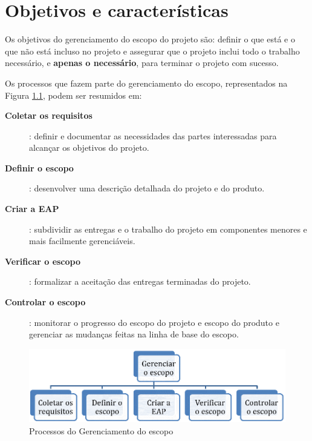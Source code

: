 \chapter{Objetivos e características}

Os objetivos do gerenciamento do escopo do projeto são: definir o que está e o que não está incluso no projeto e assegurar que o projeto inclui todo o trabalho necessário, e \textbf{apenas o necessário}, para terminar o projeto com sucesso.

Os processos que fazem parte do gerenciamento do escopo, representados na Figura \ref{fig:proc:ger:escopo}, podem ser resumidos em:

\begin{description}
	
	\item[\textbf{Coletar os requisitos}]: definir e documentar as necessidades das partes interessadas para alcançar os objetivos do projeto.
	
	\item[\textbf{Definir o escopo}]: desenvolver uma descrição detalhada do projeto e do produto.
	
	\item[\textbf{Criar a EAP}]: subdividir as entregas e o trabalho do projeto em componentes menores e mais facilmente gerenciáveis.
	
	\item[\textbf{Verificar o escopo}]: formalizar a aceitação das entregas terminadas do projeto.
	
	\item[\textbf{Controlar o escopo}]: monitorar o progresso do escopo do projeto e escopo do produto e gerenciar as mudanças feitas na linha de base do escopo.	

\end{description}

\begin{figure}[!h]
	\centering
	\includegraphics[scale=0.75]{Figuras/gerenciamento_escopo.png}
	\caption{Processos do Gerenciamento do escopo}
	\label{fig:proc:ger:escopo}
\end{figure}

